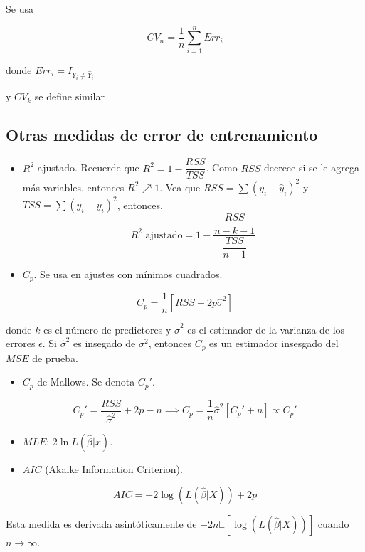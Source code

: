 \documentclass[
  12pt,
]{book}
\providecommand{\tightlist}{%
  \setlength{\itemsep}{0pt}\setlength{\parskip}{0pt}}
\theoremstyle{definition}
\theoremstyle{definition}
\theoremstyle{definition}
\theoremstyle{remark}
\begin{document}
Se usa

\begin{equation*}
CV_{n} = \frac{1}{n} \sum_{i=1}^{n} Err_{i}
\end{equation*}

donde \(Err_i = I_{Y_i \neq \hat{Y}_{i}}\)

y \(CV_{k}\) se define similar

\hypertarget{otras-medidas-de-error-de-entrenamiento}{%
\subsection{Otras medidas de error de entrenamiento}\label{otras-medidas-de-error-de-entrenamiento}}

\begin{itemize}
\item
  \(R^2\) ajustado. Recuerde que \(R^2 = 1 - \dfrac{RSS}{TSS}\). Como \(RSS\) decrece si se le agrega más variables, entonces \(R^2 \nearrow 1\). Vea que \(RSS = \sum(y_i-\hat{y}_i)^2\) y \(TSS = \sum(y_i-\bar{y}_i)^2\), entonces,
  \[R^2 \text{ ajustado}= 1-\dfrac{\dfrac{RSS}{n-k-1}}{\dfrac{TSS}{n-1}}\]
\item
  \(C_p\). Se usa en ajustes con mínimos cuadrados.
\end{itemize}

\[ C_p = \dfrac{1}{n}\left[RSS+2p\hat\sigma^2\right]\]

donde \(k\) es el número de predictores y \(\hat\sigma^2\) es el estimador de la varianza de los errores \(\epsilon\). Si \(\hat\sigma^2\) es insegado de \(\sigma^2\), entonces \(C_p\) es un estimador insesgado del \(MSE\) de prueba.

\begin{itemize}
\tightlist
\item
  \(C_p\) de Mallows. Se denota \(C_p'\).
\end{itemize}

\[ C_p' = \dfrac{RSS}{\hat\sigma^2} + 2p-n \implies C_p = \dfrac1n\hat\sigma^2[C_p'+n] \propto C_p'\]

\begin{itemize}
\item
  \(MLE\): \(2\ln L(\hat{\beta} | x)\).
\item
  \(AIC\) (Akaike Information Criterion).
\end{itemize}

\[
AIC = -2\log(L(\hat{\beta} \vert X)) + 2p 
\]

Esta medida es derivada asintóticamente de \(-2n\mathbb{E}[\log(L(\hat{\beta} \vert X))]\) cuando \(n\to \infty\).
\end{document}
